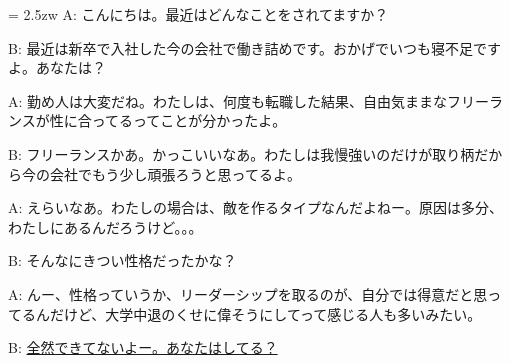 \documentclass[11pt]{amsart}
\title{}
\author{}
\newenvironment{hangall}[1]{\hangindent = 2.5zw\everypar{\hangindent = 2.5zw}}{}
\begin{document}
\maketitle
\begin{hangall}{}%
A: こんにちは。最近はどんなことをされてますか？

B: 最近は新卒で入社した今の会社で働き詰めです。おかげでいつも寝不足ですよ。あなたは？

A: 勤め人は大変だね。わたしは、何度も転職した結果、自由気ままなフリーランスが性に合ってるってことが分かったよ。

B: フリーランスかあ。かっこいいなあ。わたしは我慢強いのだけが取り柄だから今の会社でもう少し頑張ろうと思ってるよ。

A: えらいなあ。わたしの場合は、敵を作るタイプなんだよねー。原因は多分、わたしにあるんだろうけど。。。

B: そんなにきつい性格だったかな？

A: んー、性格っていうか、リーダーシップを取るのが、自分では得意だと思ってるんだけど、大学中退のくせに偉そうにしてって感じる人も多いみたい。

B: \ul{全然できてないよー。あなたはしてる？}\end{hangall}
\end{document}
